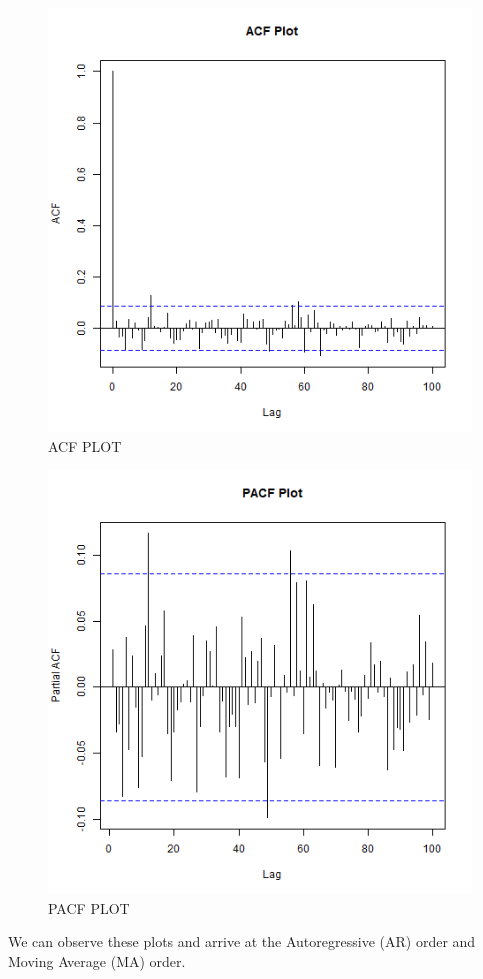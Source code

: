 \documentclass[a4paper, 12pt]{extarticle}
\begin{document}
{\begin{figure}[H]
\centering
\includegraphics[scale=0.5]{acf.png}
\caption{ACF PLOT}
\label{fig:acf}
\end{figure}
\begin{figure}[H]
\centering
\includegraphics[scale=0.5]{pacf.png}
\caption{PACF PLOT}
\label{fig:pacf}
\end{figure}
We can observe these plots and arrive at the Autoregressive (AR) order and Moving Average (MA) order.

}
\end{document}
